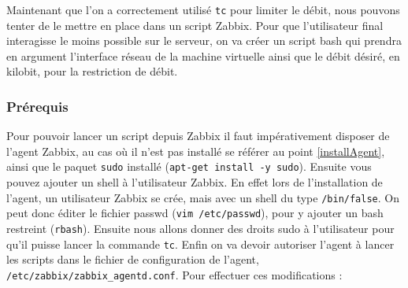 		Maintenant que l'on a correctement utilisé \verb?tc? pour limiter le débit, nous pouvons tenter de le mettre en place dans un script Zabbix. Pour que l'utilisateur final interagisse le moins possible sur le serveur, on va créer un script bash qui prendra en argument l'interface réseau de la machine virtuelle ainsi que le débit désiré, en kilobit, pour la restriction de débit.\\

		\subsubsection{\label{prerequis}Prérequis}
			\vspace{0.3cm}
		
			Pour pouvoir lancer un script depuis Zabbix il faut impérativement disposer de l'agent Zabbix, au cas où il n'est pas installé se référer au point \ref{installAgent}, ainsi que le paquet \verb?sudo? installé (\verb?apt-get install -y sudo?). Ensuite vous pouvez ajouter un shell à l'utilisateur Zabbix. En effet lors de l'installation de l'agent, un utilisateur Zabbix se crée, mais avec un shell du type \verb?/bin/false?. On peut donc éditer le fichier passwd (\verb?vim /etc/passwd?), pour y ajouter un bash restreint (\verb?rbash?). Ensuite nous allons donner des droits sudo à l'utilisateur pour qu'il puisse lancer la commande \verb?tc?. Enfin on va devoir autoriser l'agent à lancer les scripts dans le fichier de configuration de l'agent, \verb?/etc/zabbix/zabbix_agentd.conf?. Pour effectuer ces modifications : \\

			\\

